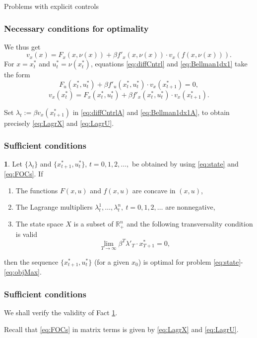 \documentclass[10pt]{beamer}
\theoremstyle{definition}
\newtheorem{Fact}{\translate{Fact}}
\begin{document}
\begin{section}{Problems with explicit controls}
\begin{frame}[fragile]
\frametitle{Necessary conditions for optimality}
We thus get \begin{equation}
v_x(x) = F_x(x,\nu(x)) + \beta  f'_x(x,\nu(x))\cdot v_x(f(x,\nu(x))).
\label{eq:Bellman1dx1}
\end{equation}
For $ x=x^*_t $ and $ u^*_t = \nu(x^*_t) $, equations \eqref{eq:diffCntrl} and \eqref{eq:Bellman1dx1} take the form
\begin{equation}
F_u(x^*_t,u^*_t) + \beta f'_u(x^*_t,u^*_t) \cdot v_x(x^*_{t+1}) = 0,
\label{eq:diffCntrlA} 
\end{equation}
\begin{equation}
v_x(x^*_t) = F_x(x^*_t,u^*_t) + \beta  f'_x(x^*_t,u^*_t)\cdot v_x(x^*_{t+1}).
\label{eq:Bellman1dx1A}
\end{equation}

Set $ \lambda_t := \beta v_x(x^*_{t+1}) $ in \eqref{eq:diffCntrlA} and \eqref{eq:Bellman1dx1A}, to obtain precisely \eqref{eq:LagrX} and \eqref{eq:LagrU}.
\end{frame}


\begin{frame}[fragile]
\frametitle{Sufficient conditions}
\begin{Fact} Let $\{\lambda_t\}$ and $\{x^*_{t+1},u^*_t\}$,
$t=0,1,2,\ldots,$ be obtained by using \eqref{eq:state}
and \eqref{eq:FOCs}. If 
	\begin{enumerate}
	\item The functions $F(x,u)$ and $f(x,u)$
	are concave in $(x,u)$,
	\item The Lagrange multipliers $\lambda_t^1,\ldots,\lambda_t^n,
	~t=0,1,2,\ldots$ are nonnegative,
	\item The state space $X$ is a subset of $\mathbb{R}^n_+$ and the following transversality condition is valid $$\lim_{T\rightarrow \infty} \beta^T \lambda'_T \cdot
	x^*_{T+1}=0,$$
	\end{enumerate} 
then the sequence $\{x^*_{t+1},u^*_t\}$ (for a given $x_0$) is optimal for problem  \eqref{eq:state}-\eqref{eq:objMax}.
\label{fc:sufficiency}\end{Fact}
\end{frame}


\begin{frame}[fragile]
\frametitle{Sufficient conditions}
We shall verify the validity of Fact \ref{fc:sufficiency}.\bigskip

Recall that \eqref{eq:FOCs} in matrix terms is given by \eqref{eq:LagrX} and \eqref{eq:LagrU}.


\end{frame}
\end{section}
\end{document}
